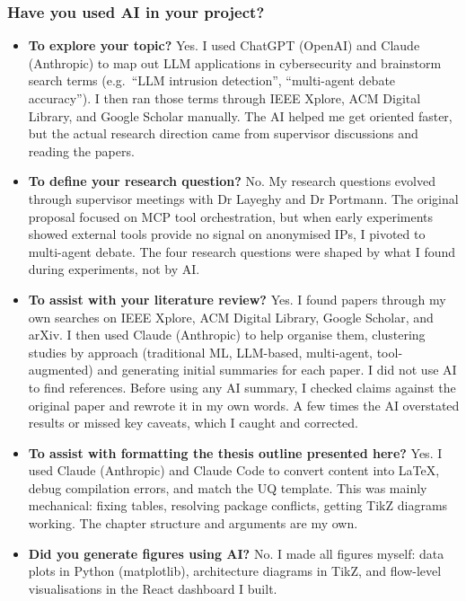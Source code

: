 \documentclass[12pt,openany,oneside,a4paper]{book}
\begin{document}
\subsubsection*{Have you used AI in your project?}
\begin{itemize}[leftmargin=1.5em, itemsep=0.5em]
  \item \textbf{To explore your topic?} Yes. I used ChatGPT (OpenAI) and Claude (Anthropic) to map out LLM applications in cybersecurity and brainstorm search terms (e.g.\ ``LLM intrusion detection'', ``multi-agent debate accuracy''). I then ran those terms through IEEE Xplore, ACM Digital Library, and Google Scholar manually. The AI helped me get oriented faster, but the actual research direction came from supervisor discussions and reading the papers.

  \item \textbf{To define your research question?} No. My research questions evolved through supervisor meetings with Dr Layeghy and Dr Portmann. The original proposal focused on MCP tool orchestration, but when early experiments showed external tools provide no signal on anonymised IPs, I pivoted to multi-agent debate. The four research questions were shaped by what I found during experiments, not by AI.

  \item \textbf{To assist with your literature review?} Yes. I found papers through my own searches on IEEE Xplore, ACM Digital Library, Google Scholar, and arXiv. I then used Claude (Anthropic) to help organise them, clustering studies by approach (traditional ML, LLM-based, multi-agent, tool-augmented) and generating initial summaries for each paper. I did not use AI to find references. Before using any AI summary, I checked claims against the original paper and rewrote it in my own words. A few times the AI overstated results or missed key caveats, which I caught and corrected.

  \item \textbf{To assist with formatting the thesis outline presented here?} Yes. I used Claude (Anthropic) and Claude Code to convert content into \LaTeX, debug compilation errors, and match the UQ template. This was mainly mechanical: fixing tables, resolving package conflicts, getting TikZ diagrams working. The chapter structure and arguments are my own.

  \item \textbf{Did you generate figures using AI?} No. I made all figures myself: data plots in Python (matplotlib), architecture diagrams in TikZ, and flow-level visualisations in the React dashboard I built.


\end{itemize}
\end{document}
